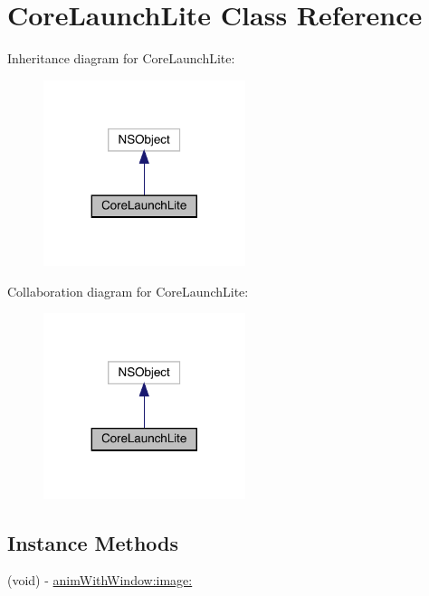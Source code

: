 \hypertarget{interface_core_launch_lite}{}\section{Core\+Launch\+Lite Class Reference}
\label{interface_core_launch_lite}


Inheritance diagram for Core\+Launch\+Lite\+:\nopagebreak
\begin{figure}[H]
\begin{center}
\leavevmode
\includegraphics[width=167pt]{interface_core_launch_lite__inherit__graph}
\end{center}
\end{figure}


Collaboration diagram for Core\+Launch\+Lite\+:\nopagebreak
\begin{figure}[H]
\begin{center}
\leavevmode
\includegraphics[width=167pt]{interface_core_launch_lite__coll__graph}
\end{center}
\end{figure}
\subsection*{Instance Methods}
\begin{DoxyCompactItemize}
\item 
(void) -\/ \mbox{\hyperlink{interface_core_launch_lite_a65dc8c897d74afd1999778a2c910d3ef}{anim\+With\+Window\+:image\+:}}
\end{DoxyCompactItemize}


